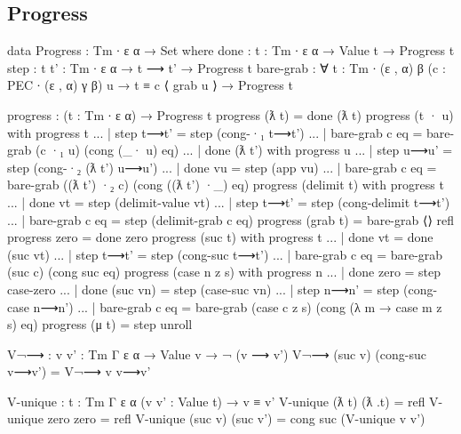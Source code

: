 \subsection{Progress}

\begin{code}
data Progress : Tm ∙ ε α → Set where
  done : {t : Tm ∙ ε α} → Value t → Progress t
  step : {t t' : Tm ∙ ε α} → t ⟶ t' → Progress t
  bare-grab : ∀ {t : Tm ∙ (ε , α) β} (c : PEC ∙ (ε , α) γ β) {u}
    → t ≡ c ⟨ grab u ⟩
    → Progress t

progress : (t : Tm ∙ ε α) → Progress t
progress (ƛ t) = done (ƛ t)
progress (t · u) with progress t
... | step t⟶t' = step (cong-·₁ t⟶t')
... | bare-grab c eq = bare-grab (c ·₁ u) (cong (_· u) eq)
... | done (ƛ t') with progress u
...   | step u⟶u' = step (cong-·₂ (ƛ t') u⟶u')
...   | done vu = step (app vu)
...   | bare-grab c eq = bare-grab ((ƛ t') ·₂ c) (cong ((ƛ t') ·_) eq)
progress (delimit t) with progress t
... | done vt = step (delimit-value vt)
... | step t⟶t' = step (cong-delimit t⟶t')
... | bare-grab c eq = step (delimit-grab c eq)
progress (grab t) = bare-grab ⟨⟩ refl
progress zero = done zero
progress (suc t) with progress t
... | done vt = done (suc vt)
... | step t⟶t' = step (cong-suc t⟶t')
... | bare-grab c eq = bare-grab (suc c) (cong suc eq)
progress (case n z s) with progress n
... | done zero = step case-zero
... | done (suc vn) = step (case-suc vn)
... | step n⟶n' = step (cong-case n⟶n')
... | bare-grab c eq = bare-grab (case c z s) (cong (λ m → case m z s) eq)
progress (μ t) = step unroll
\end{code}

\begin{code}[hide]
V¬⟶ : {v v' : Tm Γ ε α} → Value v → ¬ (v ⟶ v')
V¬⟶ (suc v) (cong-suc v⟶v') = V¬⟶ v v⟶v'

V-unique : {t : Tm Γ ε α} (v v' : Value t) → v ≡ v'
V-unique (ƛ t) (ƛ .t) = refl
V-unique zero zero = refl
V-unique (suc v) (suc v') = cong suc (V-unique v v')
\end{code}

